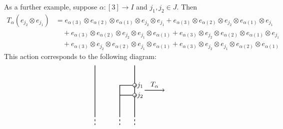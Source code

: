 \begin{example}
As a further example, suppose $\alpha : [3] \to I$ and $j_1, j_2 \in J$.
Then
\begin{align*}
	T_\alpha(e_{j_2}\otimes e_{j_1})
	&= e_{\alpha(3)} \otimes e_{\alpha(2)} \otimes e_{\alpha(1)} \otimes e_{j_2} \otimes e_{j_1}
	+ e_{\alpha(3)} \otimes e_{\alpha(2)} \otimes e_{j_2} \otimes e_{\alpha(1)} \otimes e_{j_1}\\
	&\quad + e_{\alpha(3)} \otimes e_{\alpha(2)} \otimes e_{j_2} \otimes e_{j_1} \otimes e_{\alpha(1)}
	+ e_{\alpha(3)} \otimes e_{j_2} \otimes e_{\alpha(2)} \otimes e_{\alpha(1)} \otimes e_{j_1} \\
	&\quad + e_{\alpha(3)} \otimes e_{j_2} \otimes e_{\alpha(2)} \otimes e_{j_1} \otimes e_{\alpha(1)}
	+ e_{\alpha(3)} \otimes e_{j_2} \otimes e_{j_1} \otimes e_{\alpha(2)} \otimes e_{\alpha(1)}
\end{align*}
This action corresponds to the following diagram:
\[
	\begin{tikzpicture}
		\begin{scope}[xshift=-6cm]
			\draw[thick] (-1,1.25) -- (-1, -1.25);
			\draw[thick] (1,1.25) -- (1, -1.25);
			\draw[thick,dashed] (-1,-1.25) -- ++(0,-0.5);
			\draw[thick,dashed] (1,-1.25) -- ++(0,-0.5);

			\node (ballj1) [draw, shade, circle, ball color=white, inner sep=0.07cm] at (1, 0.25) {};
			\node [right] at (ballj1) {$j_1$};
			\node (ballj2) [draw, shade, circle, ball color=white, inner sep=0.07cm] at (1, -0.25) {};
			\node [right] at (ballj2) {$j_2$};
			\draw[thick] (ballj1) -| (0.25,-1.25);
			\draw[thick] (ballj2) -- (ballj2 -| 0.25,-1.25);
			\draw[thick,dashed] (0.25,-1.25) -- ++(0,-0.5);
		\end{scope}

		\draw [thick,->] (-4.5,0) -- node [above] {$T_\alpha$} (-3.5,0);

		\def\doit{
			\draw[thick] (-1,1.75) -- (-1, -1.25);
		\draw[thick] (1,1.75) -- (1,-1.25);
		\draw[thick,dashed] (-1,-1.25) -- ++(0,-0.5);
		\draw[thick,dashed] (1,-1.25) -- ++(0,-0.5);

		\def\sidez{{1,1,-1,-1,-1}}
		\def\namez{{"$j_1$", "$j_2$", "$\alpha(1)$", "$\alpha(2)$", "$\alpha(3)$"}}
		\def\nodz{{"j1", "j2", "a1", "a2", "a3"}}
		\foreach \w in {0,...,4} {
			\pgfmathtruncatemacro{\y}{\ordr[\w]}
			\pgfmathtruncatemacro{\sd}{\sidez[\y]}
			\pgfmathparse{\nodz[\y]}
			\edef\nodenum{\pgfmathresult}
			\node (ball\nodenum) [draw, shade, circle, ball color=white, inner sep=0.07cm] at (\sd, 1.5-\w*0.5) {};
			\pgfmathparse{\namez[\y]}
			\ifthenelse{\sd=1}{\node[right]}{\node[left]} at (ball\nodenum) {\pgfmathresult};
		}

}
\end{tikzpicture}\]
\end{example}
